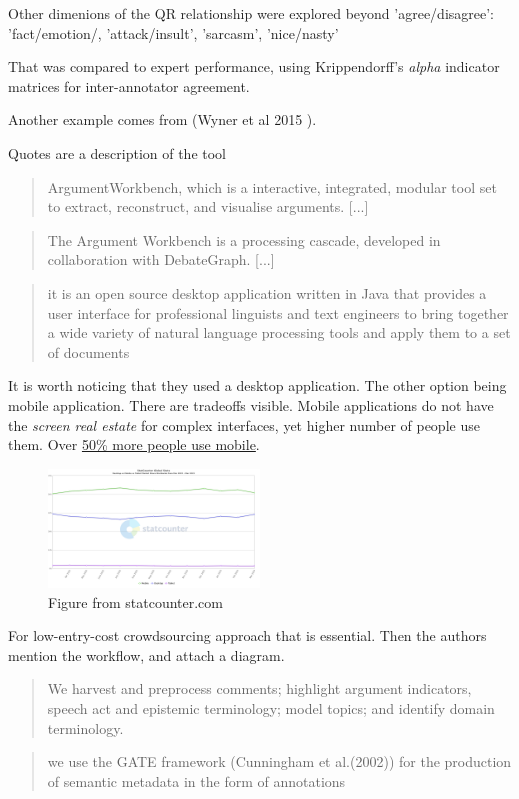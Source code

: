 \documentclass{report}
\begin{document}
Other dimenions of the QR relationship were explored beyond 'agree/disagree': 'fact/emotion/, 'attack/insult', 'sarcasm', 'nice/nasty'

That was compared to expert performance, using Krippendorff's \textit{alpha} indicator matrices for inter-annotator agreement.

Another example comes from (Wyner et al 2015 ).

Quotes are a description of the tool
\begin{quote}
 ArgumentWorkbench, which is a interactive, integrated, modular tool set to extract, reconstruct, and visualise arguments. [...]
\end{quote}
\begin{quote}
 The Argument Workbench is a processing cascade, developed in collaboration with DebateGraph. [...]
\end{quote}
\begin{quote}
 it is an open source desktop application written in Java that provides a user interface for professional linguists and text engineers to bring together a wide variety of natural language processing tools and apply them to a set of documents
\end{quote}

It is worth noticing that they used a desktop application. The other option being mobile application. There are tradeoffs visible.
Mobile applications do not have the \textit{screen real estate} for complex interfaces, yet higher number of people use them. Over \href{https:\\gs.statcounter.com/platform-market-share/desktop-mobile-tablet}{50\% more people use mobile}.

\begin{figure}[h]
    \centering
    \includegraphics[width=0.5\textwidth]{./images/StatCounter-comparison-ww-monthly-202203-202303.png}
    \caption{Figure from statcounter.com}
\end{figure}


For low-entry-cost crowdsourcing approach that is essential.
Then the authors mention the workflow, and attach a diagram.
\begin{quote}
 We harvest and preprocess comments; highlight argument indicators, speech act and epistemic terminology; model topics; and identify domain terminology.
\end{quote}
\begin{quote}
 we use the GATE framework (Cunningham et al.(2002)) for the production of semantic metadata in the form of annotations
\end{quote}
\end{document}
